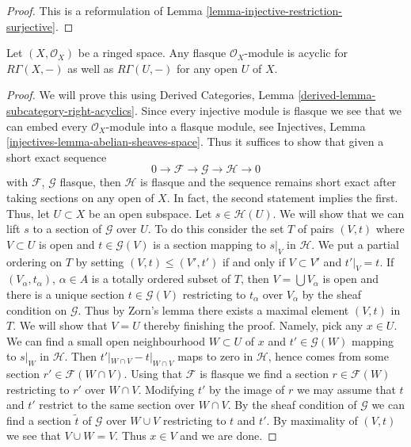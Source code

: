 \begin{proof}
This is a reformulation of Lemma \ref{lemma-injective-restriction-surjective}.
\end{proof}

\begin{lemma}
\label{lemma-flasque-acyclic}
Let $(X, \mathcal{O}_X)$ be a ringed space. Any flasque $\mathcal{O}_X$-module
is acyclic for $R\Gamma(X, -)$ as well as $R\Gamma(U, -)$ for any
open $U$ of $X$.
\end{lemma}

\begin{proof}
We will prove this using
Derived Categories, Lemma \ref{derived-lemma-subcategory-right-acyclics}.
Since every injective module is flasque we see that we can embed
every $\mathcal{O}_X$-module into a flasque module, see
Injectives, Lemma \ref{injectives-lemma-abelian-sheaves-space}.
Thus it suffices to show that given a short exact sequence
$$
0 \to \mathcal{F} \to \mathcal{G} \to \mathcal{H} \to 0
$$
with $\mathcal{F}$, $\mathcal{G}$ flasque, then $\mathcal{H}$
is flasque and the sequence remains short exact after taking sections
on any open of $X$. In fact, the second statement implies the first.
Thus, let $U \subset X$ be an open subspace. Let $s \in \mathcal{H}(U)$.
We will show that we can lift $s$ to a section of $\mathcal{G}$
over $U$. To do this consider the set $T$ of pairs $(V, t)$
where $V \subset U$ is open and $t \in \mathcal{G}(V)$ is a section
mapping to $s|_V$ in $\mathcal{H}$.
We put a partial ordering on $T$ by setting
$(V, t) \leq (V', t')$ if and only if $V \subset V'$ and $t'|_V = t$.
If $(V_\alpha, t_\alpha)$, $\alpha \in A$
is a totally ordered subset of $T$, then $V = \bigcup V_\alpha$
is open and there is a unique section $t \in \mathcal{G}(V)$
restricting to $t_\alpha$ over $V_\alpha$ by the sheaf condition on
$\mathcal{G}$. Thus by Zorn's lemma there exists a maximal element
$(V, t)$ in $T$. We will show that $V = U$ thereby finishing the proof.
Namely, pick any $x \in U$. We can find a small open neighbourhood
$W \subset U$ of $x$ and $t' \in \mathcal{G}(W)$ mapping to $s|_W$
in $\mathcal{H}$. Then $t'|_{W \cap V} - t|_{W \cap V}$ maps to
zero in $\mathcal{H}$, hence comes from some section
$r' \in \mathcal{F}(W \cap V)$. Using that $\mathcal{F}$ is flasque
we find a section $r \in \mathcal{F}(W)$ restricting to $r'$
over $W \cap V$. Modifying $t'$ by the image of $r$ we may
assume that $t$ and $t'$ restrict to the same section over
$W \cap V$. By the sheaf condition of $\mathcal{G}$
we can find a section $\tilde t$ of $\mathcal{G}$ over
$W \cup V$ restricting to $t$ and $t'$.
By maximality of $(V, t)$ we see that $V \cup W = V$.
Thus $x \in V$ and we are done.
\end{proof}

